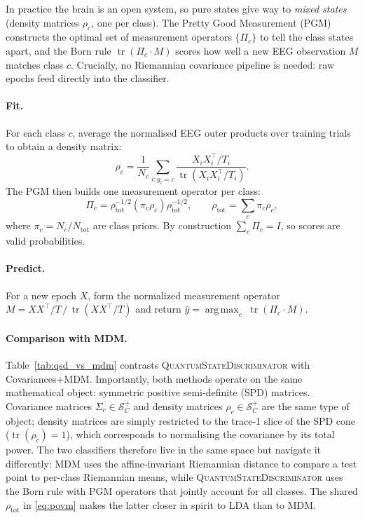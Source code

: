 \documentclass{article}
\newcommand{\tr}{\operatorname{tr}}
\DeclareMathOperator*{\argmax}{arg\,max}
\begin{document}
In practice the brain is an open system, so pure states give way to
\emph{mixed states} (density matrices $\rho_c$, one per class).  The
Pretty Good Measurement (PGM) constructs the optimal set of measurement
operators $\{\Pi_c\}$ to tell the class states apart, and the Born rule
$\tr(\Pi_c \cdot M)$ scores how well a new EEG observation $M$ matches
class $c$.  Crucially, no Riemannian covariance pipeline is needed: raw
epochs feed directly into the classifier.

\paragraph{Fit.}
For each class $c$, average the normalised EEG outer products over training
trials to obtain a density matrix:
\begin{equation}
  \rho_c = \frac{1}{N_c}\sum_{i:y_i=c} \frac{X_i X_i^\top / T_i}{\tr(X_i X_i^\top / T_i)}.
  \label{eq:tomography}
\end{equation}
The PGM then builds one measurement operator per class:
\begin{equation}
  \Pi_c = \rho_{\text{tot}}^{-1/2}(\pi_c\rho_c)\rho_{\text{tot}}^{-1/2},
  \qquad \rho_{\text{tot}} = \textstyle\sum_c \pi_c\rho_c,
  \label{eq:povm}
\end{equation}
where $\pi_c = N_c/N_{\text{tot}}$ are class priors.
By construction $\sum_c\Pi_c = I$, so scores are valid probabilities.

\paragraph{Predict.}
For a new epoch $X$, form the normalized measurement operator
$M = XX^\top/T\,/\,\tr(XX^\top/T)$ and return
$\hat{y} = \argmax_c\;\tr(\Pi_c \cdot M)$.

\paragraph{Comparison with MDM.}
Table~\ref{tab:qsd_vs_mdm} contrasts \textsc{QuantumStateDiscriminator}
with Covariances+MDM.  Importantly, both methods operate on the same
mathematical object: symmetric positive semi-definite (SPD) matrices.
Covariance matrices $\Sigma_c \in \mathcal{S}^+_C$ and density matrices
$\rho_c \in \mathcal{S}^+_C$ are the same type of object; density matrices
are simply restricted to the trace-1 slice of the SPD cone
($\tr(\rho_c)=1$), which corresponds to normalising the covariance by its
total power.  The two classifiers therefore live in the same space but
navigate it differently: MDM uses the affine-invariant Riemannian distance
to compare a test point to per-class Riemannian means, while
\textsc{QuantumStateDiscriminator} uses the Born rule with PGM operators
that jointly account for all classes.  The shared
$\rho_{\text{tot}}$ in \eqref{eq:povm} makes the latter closer in spirit
to LDA than to MDM.
\end{document}
